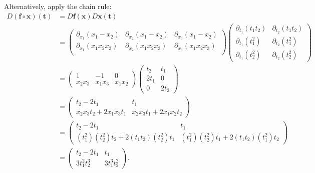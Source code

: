 \documentclass[11pt]{article}
\renewcommand{\vec}[1]{\mathbf{#1}}
\begin{document}
Alternatively, apply the chain rule:
\begin{align*}
    D(\vec f \circ \vec x)(\vec t) &= D\vec f(\vec x) D\vec x(\vec t) \\
        &=
        \begin{pmatrix}
            \partial_{x_1} (x_1 - x_2) & \partial_{x_2} (x_1 - x_2) & \partial_{x_3} (x_1 - x_2) \\
            \partial_{x_1} (x_1 x_2 x_3) & \partial_{x_2} (x_1 x_2 x_3) & \partial_{x_3} (x_1 x_2 x_3) \\
        \end{pmatrix}
        \begin{pmatrix}
            \partial_{t_1} (t_1 t_2) & \partial_{t_2} (t_1 t_2) \\
            \partial_{t_1} (t_1^2) & \partial_{t_2} (t_1^2) \\
            \partial_{t_1} (t_2^2) & \partial_{t_2} (t_2^2)
        \end{pmatrix} \\
        &=
        \begin{pmatrix}
            1 & -1 & 0 \\
            x_2 x_3 & x_1 x_3 & x_1 x_2
        \end{pmatrix}
        \begin{pmatrix}
            t_2 & t_1 \\
            2 t_1 & 0 \\
            0 & 2 t_2
        \end{pmatrix} \\
        &= 
        \begin{pmatrix}
            t_2 - 2 t_1 & t_1 \\
            x_2 x_3 t_2 + 2 x_1 x_3 t_1 & x_2 x_3 t_1 + 2 x_1 x_2 t_2
        \end{pmatrix} \\
        &=
        \begin{pmatrix}
            t_2 - 2 t_1 & t_1 \\
            (t_1^2) (t_2^2) t_2 + 2 (t_1 t_2) (t_2^2) t_1 & (t_1^2) (t_2^2) t_1 + 2 (t_1 t_2) (t_1^2) t_2
        \end{pmatrix} \\
        &=
        \begin{pmatrix}
            t_2 - 2 t_1 & t_1 \\
            3 t_1^2 t_2^3 & 3 t_1^3 t_2^2
        \end{pmatrix}.
\end{align*}
\end{document}
